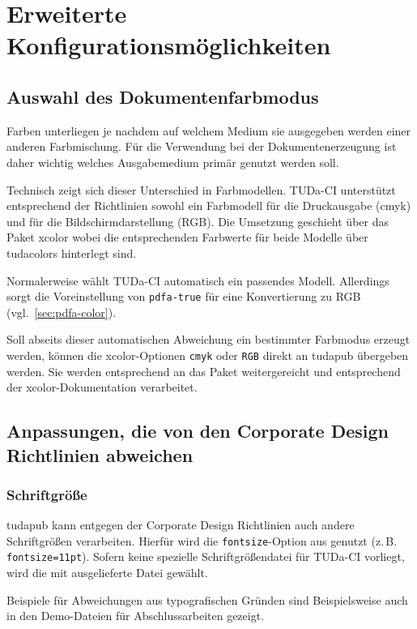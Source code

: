 \documentclass[
	ngerman,
	accentcolor=9c,%
	]{tudapub}
\let\code\texttt
\let\pck\textsf
\let\cls\textsf
\begin{document}
\section{Erweiterte Konfigurationsmöglichkeiten}

\subsection{Auswahl des Dokumentenfarbmodus}
Farben unterliegen je nachdem auf welchem Medium sie ausgegeben werden einer anderen Farbmischung. Für die Verwendung bei der Dokumentenerzeugung ist daher wichtig welches Ausgabemedium primär genutzt werden soll.

Technisch zeigt sich dieser Unterschied in Farbmodellen. TUDa-CI unterstützt entsprechend der Richtlinien sowohl ein Farbmodell für die Druckausgabe (cmyk) und für die Bildschirmdarstellung (RGB). Die Umsetzung geschieht über das Paket \pck{xcolor} wobei die entsprechenden Farbwerte für beide Modelle über \pck{tudacolors} hinterlegt sind.

Normalerweise wählt TUDa-CI automatisch ein passendes Modell. Allerdings sorgt die Voreinstellung von \code{pdfa-true} für eine Konvertierung zu RGB (vgl.~\ref{sec:pdfa-color}).

Soll abseits dieser automatischen Abweichung ein bestimmter Farbmodus erzeugt werden, können die \pck{xcolor}-Optionen \code{cmyk} oder \code{RGB} direkt an \cls{tudapub} übergeben werden. Sie werden entsprechend an das Paket weitergereicht und entsprechend der \pck{xcolor}-Dokumentation verarbeitet.

\subsection{Anpassungen, die von den Corporate Design Richtlinien abweichen}

\subsubsection{Schriftgröße}
\cls{tudapub} kann entgegen der Corporate Design Richtlinien auch andere Schriftgrößen verarbeiten. Hierfür wird die \code{fontsize}-Option aus \KOMAScript{} genutzt (z.\,B. \code{fontsize=11pt}). Sofern keine spezielle Schriftgrößendatei für TUDa-CI vorliegt, wird die mit \KOMAScript{} ausgelieferte Datei gewählt.

Beispiele für Abweichungen aus typografischen Gründen sind Beispielsweise auch in den Demo-Dateien für Abschlussarbeiten gezeigt.
\end{document}
